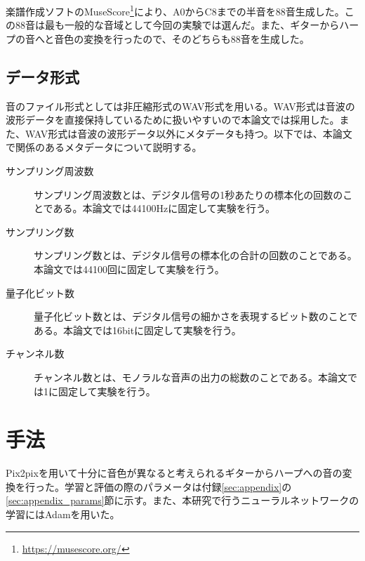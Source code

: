 楽譜作成ソフトのMuseScore\footnote{\url{https://musescore.org/}}により、A0からC8までの半音を88音生成した。この88音は最も一般的な音域として今回の実験では選んだ。また、ギターからハープの音へと音色の変換を行ったので、そのどちらも88音を生成した。

\subsection{データ形式}

音のファイル形式としては非圧縮形式のWAV形式を用いる。WAV形式は音波の波形データを直接保持しているために扱いやすいので本論文では採用した。また、WAV形式は音波の波形データ以外にメタデータも持つ。以下では、本論文で関係のあるメタデータについて説明する。

\begin{description}

\item[サンプリング周波数]\mbox{}

サンプリング周波数とは、デジタル信号の1秒あたりの標本化の回数のことである。本論文では44100Hzに固定して実験を行う。

\item[サンプリング数]\mbox{}

サンプリング数とは、デジタル信号の標本化の合計の回数のことである。本論文では44100回に固定して実験を行う。

\item[量子化ビット数]\mbox{}

量子化ビット数とは、デジタル信号の細かさを表現するビット数のことである。本論文では16bitに固定して実験を行う。

\item[チャンネル数]\mbox{}

チャンネル数とは、モノラルな音声の出力の総数のことである。本論文では1に固定して実験を行う。

\end{description}

\section{手法}

Pix2pixを用いて十分に音色が異なると考えられるギターからハープへの音の変換を行った。学習と評価の際のパラメータは付録\ref{sec:appendix}の\ref{sec:appendix_params}節に示す。また、本研究で行うニューラルネットワークの学習にはAdamを用いた。


